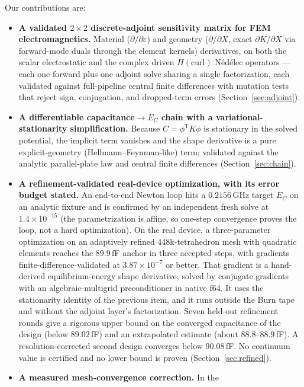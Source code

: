 \documentclass{anvil-paper}
\begin{document}
Our contributions are:
\begin{itemize}
  \item \textbf{A validated $2\times 2$ discrete-adjoint sensitivity
    matrix for FEM electromagnetics.} Material
    ($\partial/\partial\varepsilon$) and geometry ($\partial/\partial X$,
    exact $\partial K/\partial X$ via forward-mode duals through the
    element kernels) derivatives, on both the scalar electrostatic and
    the complex driven $H(\mathrm{curl})$ N\'ed\'elec operators --- each
    one forward plus one adjoint solve sharing a single factorization,
    each validated against full-pipeline central finite differences with
    mutation tests that reject sign, conjugation, and dropped-term errors
    (Section~\ref{sec:adjoint}).
  \item \textbf{A differentiable capacitance$\to E_C$ chain with a
    variational-stationarity simplification.} Because $C =
    \phi^{\mathsf{T}} K\phi$ is stationary in the solved potential, the
    implicit term vanishes and the shape derivative is a pure
    explicit-geometry (Hellmann--Feynman-like) term; validated against
    the analytic parallel-plate law and central finite differences
    (Section~\ref{sec:chain}).
  \item \textbf{A refinement-validated real-device optimization, with
    its error budget stated.} An end-to-end Newton loop hits a
    $0.2156$\,GHz target $E_C$ on an analytic fixture and is confirmed
    by an independent fresh solve at $1.4\times 10^{-15}$ (the
    parametrization is affine, so one-step convergence proves the loop,
    not a hard optimization). On the real device, a three-parameter
    optimization on an adaptively refined 448k-tetrahedron mesh with
    quadratic elements reaches the $89.9$\,fF anchor in three accepted
    steps, with gradients finite-difference-validated at
    $3.87\times10^{-7}$ or better. That gradient is a hand-derived
    equilibrium-energy shape derivative, solved by conjugate gradients
    with an algebraic-multigrid preconditioner in native f64. It uses
    the stationarity identity of the previous item, and it runs outside
    the Burn tape and without the adjoint layer's factorization. Seven held-out refinement rounds
    give a rigorous upper bound on the converged capacitance of the
    design (below $89.02$\,fF) and an extrapolated estimate (about
    $88.8$--$88.9$\,fF). A resolution-corrected second design converges
    below $90.08$\,fF. No continuum value is certified and no lower
    bound is proven (Section~\ref{sec:refined}).
  \item \textbf{A measured mesh-convergence correction.} In the

\end{itemize}
\end{document}
